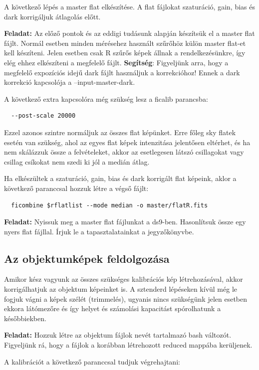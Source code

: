 \documentclass{article}
\begin{document}
A következő lépés a master flat elkészítése. A flat fájlokat szaturáció, gain,
bias és dark korrigáljuk átlagolás előtt.

{\bf Feladat:}
Az előző pontok és az eddigi tudásunk alapján készítsük el a master flat fájlt.
Normál esetben minden mérésehez használt szűrőhöz külön master flat-et kell
készíteni. Jelen esetben csak R szűrős képek állnak a rendelkezésünkre, így elég
ehhez elkészíteni a megfelelő fájlt.
{\bf Segítség}:
Figyeljünk arra, hogy a megfelelő expozíciós idejű dark fájlt használjuk a
korrekcióhoz! Ennek a dark korrekció kapcsolója a --input-master-dark.

A következő extra kapcsolóra még szükség lesz a ficalib parancsba:
\begin{verbatim}
  --post-scale 20000
\end{verbatim}
Ezzel azonos szintre normáljuk az összes flat képünket. Erre főleg sky flatek
esetén van szükség, ahol az egyes flat képek intenzitása jelentősen eltérhet,
és ha nem skálázzuk össze a felvételeket, akkor az esetlegesen látszó csillagokat
vagy csillag csíkokat nem szedi ki jól a medián átlag.

Ha elkészültek a szaturáció, gain, bias és dark korrigált flat képeink, aklor a
következő paranccsal hozzuk létre a végső fájlt:

\begin{verbatim}
  ficombine $rflatlist --mode median -o master/flatR.fits
\end{verbatim}

{\bf Feladat:}
Nyissuk meg a master flat fájlunkat a ds9-ben. Hasonlítsuk össze egy nyers flat
fájllal. Írjuk le a tapasztalatainkat a jegyzőkönyvbe.


\subsection{Az objektumképek feldolgozása}

Amikor kész vagyunk az összes szükséges kalibrációs kép létrehozásával, akkor
korrigálhatjuk az objektum képeinket is. A sztenderd lépéseken kívül még le
fogjuk vágni a képek szélét (trimmelés), ugyanis nincs szükségünk jelen esetben
ekkora látómezőre és így helyet és számolási kapacitást spórolhatunk a
későbbiekben.

{\bf Feladat:}
Hozzuk létre az objektum fájlok nevét tartalmazó bash változót. Figyeljünk rá,
hogy a fájlok a korábban létrehozott reduced mappába kerüljenek.

A kalibrációt a következő paranccsal tudjuk végrehajtani:
\end{document}
